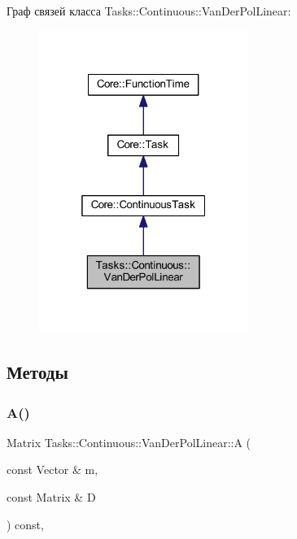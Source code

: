 Граф связей класса Tasks\+:\+:Continuous\+:\+:Van\+Der\+Pol\+Linear\+:\nopagebreak
\begin{figure}[H]
\begin{center}
\leavevmode
\includegraphics[width=193pt]{class_tasks_1_1_continuous_1_1_van_der_pol_linear__coll__graph}
\end{center}
\end{figure}


\subsection{Методы}
\hypertarget{class_tasks_1_1_continuous_1_1_van_der_pol_linear_a2eefb5fca01c3517c44d2683032fda9d}{}\label{class_tasks_1_1_continuous_1_1_van_der_pol_linear_a2eefb5fca01c3517c44d2683032fda9d} 
\subsubsection{\texorpdfstring{A()}{A()}}
{\footnotesize\ttfamily Matrix Tasks\+::\+Continuous\+::\+Van\+Der\+Pol\+Linear\+::A (\begin{DoxyParamCaption}\item[{const Vector \&}]{m,  }\item[{const Matrix \&}]{D }\end{DoxyParamCaption}) const\hspace{0.3cm}{\ttfamily [override]}, {\ttfamily [virtual]}}



